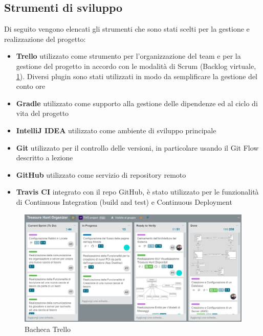 \documentclass[12pt, italian]{article}
\begin{document}
\subsection{Strumenti di sviluppo}
Di seguito vengono elencati gli strumenti che sono stati scelti per la gestione e realizzazione del progetto:
\begin{itemize}
	\item \textbf{Trello} utilizzato come strumento per l'organizzazione del team e per la gestione del progetto in accordo con le modalità di Scrum (Backlog virtuale, \ref{trello_board}). Diversi plugin sono stati utilizzati in modo da semplificare la gestione del conto ore
	\item \textbf{Gradle} utilizzato come supporto alla gestione delle dipendenze ed al ciclo di vita del progetto
	\item \textbf{IntelliJ IDEA} utilizzato come ambiente di sviluppo principale
	\item \textbf{Git} utilizzato per il controllo delle versioni, in particolare usando il Git Flow descritto a lezione
	\item \textbf{GitHub} utilizzato come servizio di repository remoto
	\item \textbf{Travis CI} integrato con il repo GitHub, è stato utilizzato per le funzionalità di Continuous Integration (build and test) e Continuous Deployment
\end{itemize}

\begin{figure}[H]
    \centering
    \includegraphics[width=1\textwidth]{img/trello01.png}
    \caption{Bacheca Trello}
    \label{trello_board}
\end{figure}

\newpage
\end{document}
